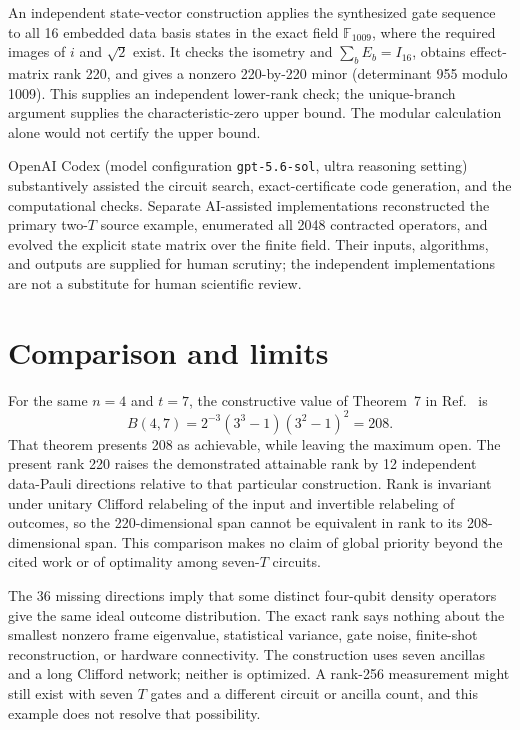 \documentclass[aps,pra,reprint,floatfix,superscriptaddress,nofootinbib]{revtex4-2}
\begin{document}
An independent state-vector construction applies the synthesized gate sequence to all 16 embedded data basis states in the exact field $\mathbb F_{1009}$, where the required images of $i$ and $\sqrt2$ exist. It checks the isometry and $\sum_bE_b=I_{16}$, obtains effect-matrix rank 220, and gives a nonzero 220-by-220 minor (determinant 955 modulo 1009). This supplies an independent lower-rank check; the unique-branch argument supplies the characteristic-zero upper bound. The modular calculation alone would not certify the upper bound.

OpenAI Codex (model configuration \texttt{gpt-5.6-sol}, ultra reasoning setting) substantively assisted the circuit search, exact-certificate code generation, and the computational checks. Separate AI-assisted implementations reconstructed the primary two-$T$ source example, enumerated all 2048 contracted operators, and evolved the explicit state matrix over the finite field. Their inputs, algorithms, and outputs are supplied for human scrutiny; the independent implementations are not a substitute for human scientific review.

\section{Comparison and limits}

For the same $n=4$ and $t=7$, the constructive value of Theorem~7 in Ref.~\cite{LoMonaco2025} is
\begin{equation}
 B(4,7)=2^{-3}(3^3-1)(3^2-1)^2=208.
 \label{eq:prior}
\end{equation}
That theorem presents 208 as achievable, while leaving the maximum open. The present rank 220 raises the demonstrated attainable rank by 12 independent data-Pauli directions relative to that particular construction. Rank is invariant under unitary Clifford relabeling of the input and invertible relabeling of outcomes, so the 220-dimensional span cannot be equivalent in rank to its 208-dimensional span. This comparison makes no claim of global priority beyond the cited work or of optimality among seven-$T$ circuits.

The 36 missing directions imply that some distinct four-qubit density operators give the same ideal outcome distribution. The exact rank says nothing about the smallest nonzero frame eigenvalue, statistical variance, gate noise, finite-shot reconstruction, or hardware connectivity. The construction uses seven ancillas and a long Clifford network; neither is optimized. A rank-256 measurement might still exist with seven $T$ gates and a different circuit or ancilla count, and this example does not resolve that possibility.
\end{document}
